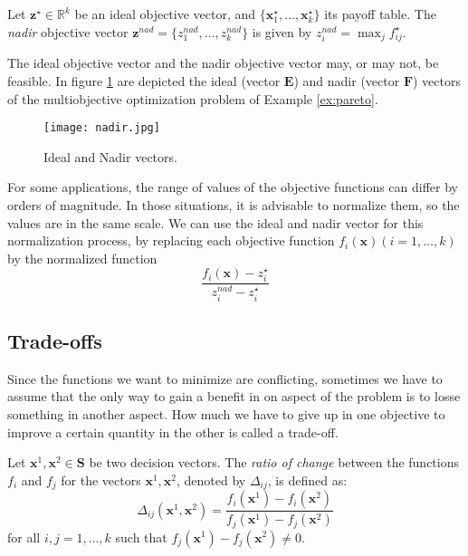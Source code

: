 {\begin{definition}
Let $\mathbf{z}^\star \in \mathbb{R}^k$ be an ideal objective vector, and $\{ \mathbf{x}^\star_1, \ldots, \mathbf{x}^\star_k \}$ its payoff table. The \emph{nadir} objective vector $\mathbf{z}^{nad} = \{ z^{nad}_1, \ldots, z^{nad}_k \}$ is given by $z^{nad}_i = \max_j f^\star_{ij}$.
\end{definition}

The ideal objective vector and the nadir objective vector may, or may not, be feasible. In figure \ref{fig:nadir} are depicted the ideal (vector $\mathbf{E}$) and nadir (vector $\mathbf{F}$) vectors of the multiobjective optimization problem of Example \ref{ex:pareto}.

\begin{figure}[h]
\centering\texttt{[image: nadir.jpg]}
\caption{\label{fig:nadir}Ideal and Nadir vectors.}
\end{figure}

For some applications, the range of values of the objective functions can differ by orders of magnitude. In those situations, it is advisable to normalize them, so the values are in the same scale. We can use the ideal and nadir vector for this normalization process, by replacing each objective function $f_i (\mathbf{x}) (i = 1, \ldots, k)$ by the normalized function
\[
\frac{f_i(\mathbf{x}) - z^\star_i}{z^{nad}_i - z^\star_i}
\]


\subsection{Trade-offs}
\label{sec:trade_offs}

Since the functions we want to minimize are conflicting, sometimes we have to assume that the only way to gain a benefit in on aspect of the problem is to losse something in another aspect. How much we have to give up in one objective to improve a certain quantity in the other is called a trade-off.

\begin{definition}
Let $\mathbf{x}^1, \mathbf{x}^2 \in \mathbf{S}$ be two decision vectors. The \emph{ratio of change} between the functions $f_i$ and $f_j$ for the vectors $\mathbf{x}^1, \mathbf{x}^2$, denoted by $\Delta_{ij}$, is defined as:
\[
\Delta_{ij} ( \mathbf{x}^1, \mathbf{x}^2 ) = \frac{f_i(\mathbf{x}^1) - f_i(\mathbf{x}^2)}{f_j(\mathbf{x}^1) - f_j(\mathbf{x}^2)}
\] 
for all $i, j = 1, \ldots, k$ such that $f_j(\mathbf{x}^1) - f_j(\mathbf{x}^2) \neq 0$.
\end{definition}

}
